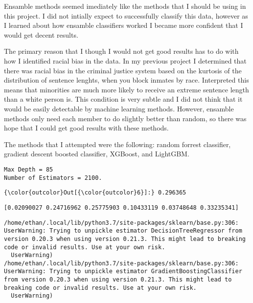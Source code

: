 \documentclass[11pt]{article}
\begin{document}
Ensamble methods seemed imediately like the methods that I should be
using in this project. I did not intially expect to successfully
classify this data, however as I learned about how ensamble classifiers
worked I became more confident that I would get decent results.

The primary reason that I though I would not get good results has to do
with how I identified racial bias in the data. In my previous project I
determined that there was racial bias in the criminal justice system
based on the kurtosis of the distribution of sentence lenghts, when you
block inmates by race. Interpreted this means that minorities are much
more likely to receive an extreme sentence length than a white person
is. This condition is very subtle and I did not think that it would be
easily detectable by machine learning methods. However, ensamble methods
only need each member to do slightly better than random, so there was
hope that I could get good results with these methods.

The methods that I attempted were the following: random forrest
classifier, gradient descent boosted classifier, XGBoost, and LightGBM.

    \begin{Verbatim}[commandchars=\\\{\}]
Max Depth = 85 
Number of Estimators = 2100.

    \end{Verbatim}

    

\begin{Verbatim}[commandchars=\\\{\}]
{\color{outcolor}Out[{\color{outcolor}6}]:} 0.296365
\end{Verbatim}
            
    \begin{Verbatim}[commandchars=\\\{\}]
[0.02090027 0.24716962 0.25775903 0.10433119 0.03748648 0.33235341]

    \end{Verbatim}

    \begin{Verbatim}[commandchars=\\\{\}]
/home/ethan/.local/lib/python3.7/site-packages/sklearn/base.py:306: UserWarning: Trying to unpickle estimator DecisionTreeRegressor from version 0.20.3 when using version 0.21.3. This might lead to breaking code or invalid results. Use at your own risk.
  UserWarning)
/home/ethan/.local/lib/python3.7/site-packages/sklearn/base.py:306: UserWarning: Trying to unpickle estimator GradientBoostingClassifier from version 0.20.3 when using version 0.21.3. This might lead to breaking code or invalid results. Use at your own risk.
  UserWarning)

    \end{Verbatim}
\end{document}
